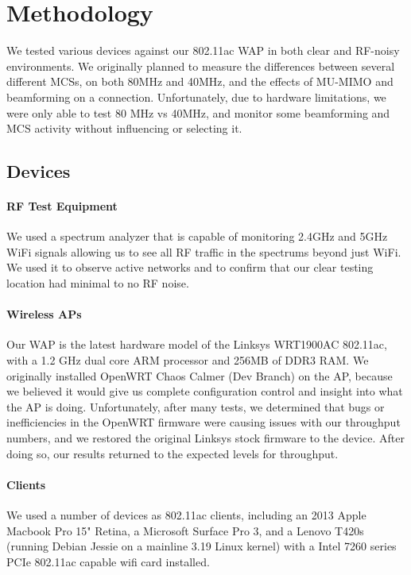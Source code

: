 \section{Methodology}
\label{sec:methodology}

We tested various devices against our 802.11ac WAP in both clear and RF-noisy
environments. We originally planned to measure the differences between several
different MCSs, on both 80MHz and 40MHz, and the effects of MU-MIMO and
beamforming on a connection. Unfortunately, due to hardware limitations, we were
only able to test 80 MHz vs 40MHz, and monitor some beamforming and MCS activity
without influencing or selecting it.

\subsection{Devices}

\paragraph{RF Test Equipment}

We used a spectrum analyzer that is capable of monitoring 2.4GHz and 5GHz WiFi
signals allowing us to see all RF traffic in the spectrums beyond just WiFi.
We used it to observe active networks and to confirm that our clear testing
location had minimal to no RF noise.

\paragraph{Wireless APs}

Our WAP is the latest hardware model of the Linksys WRT1900AC 802.11ac,
with a 1.2 GHz dual core ARM processor and 256MB of DDR3 RAM. We originally
installed OpenWRT Chaos Calmer (Dev Branch) on the AP, because we believed it
would give us complete configuration control and insight into what the AP is
doing. Unfortunately, after many tests, we determined that bugs or
inefficiencies in the OpenWRT firmware were causing issues with our throughput
numbers, and we restored the original Linksys stock firmware to the device.
After doing so, our results returned to the expected levels for throughput.

\paragraph{Clients}

We used a number of devices as 802.11ac clients, including an 2013 Apple
Macbook Pro 15" Retina, a Microsoft Surface Pro 3, and a
Lenovo T420s (running Debian Jessie on a mainline 3.19 Linux kernel)
with a Intel 7260 series PCIe 802.11ac capable wifi card installed.

